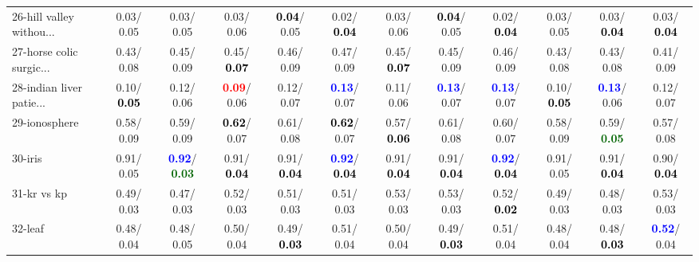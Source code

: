 \begin{table}[h]
\begin{center}
{\begin{tabular}{lc|c|c|c|c|c|c|c|c|c|c}
26-hill valley withou... &   0.03/  0.05 &   0.03/  0.05 &   0.03/  0.06 & \textcolor{black}{\textbf{  0.04}}/  0.05 &   0.02/\textcolor{black}{\textbf{  0.04}} &   0.03/  0.06 & \textcolor{black}{\textbf{  0.04}}/  0.05 &   0.02/\textcolor{black}{\textbf{  0.04}} &   0.03/  0.05 &   0.03/\textcolor{black}{\textbf{  0.04}} &   0.03/\textcolor{black}{\textbf{  0.04}} \\
27-horse colic surgic... &   0.43/  0.08 &   0.45/  0.09 &   0.45/\textcolor{black}{\textbf{  0.07}} &   0.46/  0.09 &   0.47/  0.09 &   0.45/\textcolor{black}{\textbf{  0.07}} &   0.45/  0.09 &   0.46/  0.09 &   0.43/  0.08 &   0.43/  0.08 &   0.41/  0.09 \\
28-indian liver patie... &   0.10/\textcolor{black}{\textbf{  0.05}} &   0.12/  0.06 & \textcolor{red}{\textbf{  0.09}}/  0.06 &   0.12/  0.07 & \textcolor{blue}{\textbf{  0.13}}/  0.07 &   0.11/  0.06 & \textcolor{blue}{\textbf{  0.13}}/  0.07 & \textcolor{blue}{\textbf{  0.13}}/  0.07 &   0.10/\textcolor{black}{\textbf{  0.05}} & \textcolor{blue}{\textbf{  0.13}}/  0.06 &   0.12/  0.07 \\ \hline
29-ionosphere &   0.58/  0.09 &   0.59/  0.09 & \textcolor{black}{\textbf{  0.62}}/  0.07 &   0.61/  0.08 & \textcolor{black}{\textbf{  0.62}}/  0.07 &   0.57/\textcolor{black}{\textbf{  0.06}} &   0.61/  0.08 &   0.60/  0.07 &   0.58/  0.09 &   0.59/\textcolor{darkgreen}{\textbf{  0.05}} &   0.57/  0.08 \\
30-iris &   0.91/  0.05 & \textcolor{blue}{\textbf{  0.92}}/\textcolor{darkgreen}{\textbf{  0.03}} &   0.91/\textcolor{black}{\textbf{  0.04}} &   0.91/\textcolor{black}{\textbf{  0.04}} & \textcolor{blue}{\textbf{  0.92}}/\textcolor{black}{\textbf{  0.04}} &   0.91/\textcolor{black}{\textbf{  0.04}} &   0.91/\textcolor{black}{\textbf{  0.04}} & \textcolor{blue}{\textbf{  0.92}}/\textcolor{black}{\textbf{  0.04}} &   0.91/  0.05 &   0.91/\textcolor{black}{\textbf{  0.04}} &   0.90/\textcolor{black}{\textbf{  0.04}} \\
31-kr vs kp &   0.49/  0.03 &   0.47/  0.03 &   0.52/  0.03 &   0.51/  0.03 &   0.51/  0.03 &   0.53/  0.03 &   0.53/  0.03 &   0.52/\textcolor{black}{\textbf{  0.02}} &   0.49/  0.03 &   0.48/  0.03 &   0.53/  0.03 \\
32-leaf &   0.48/  0.04 &   0.48/  0.05 &   0.50/  0.04 &   0.49/\textcolor{black}{\textbf{  0.03}} &   0.51/  0.04 &   0.50/  0.04 &   0.49/\textcolor{black}{\textbf{  0.03}} &   0.51/  0.04 &   0.48/  0.04 &   0.48/\textcolor{black}{\textbf{  0.03}} & \textcolor{blue}{\textbf{  0.52}}/  0.04 \\\end{tabular}
}\label{strats0a5NN}
\end{center}
\end{table}
